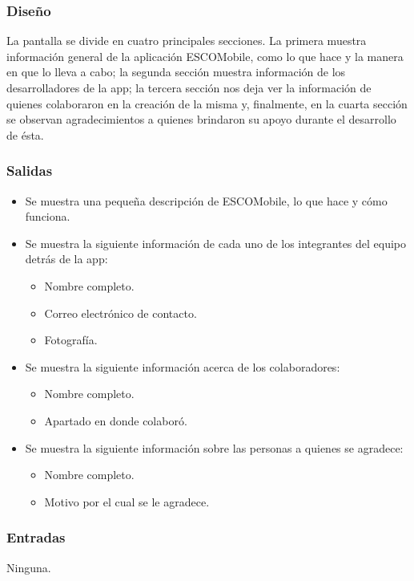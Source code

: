 \subsubsection{Diseño}
	\noindent
	La pantalla se divide en cuatro principales secciones. La primera muestra información general
	de la aplicación ESCOMobile, como lo que hace y la manera en que lo lleva a cabo; la segunda
	sección muestra información de los desarrolladores de la app; la tercera sección nos deja
	ver la información de quienes colaboraron en la creación de la misma y, finalmente, en la cuarta
	sección se observan agradecimientos a quienes brindaron su apoyo durante el desarrollo de ésta.

\pagebreak
{}

\subsubsection{Salidas}
	\begin{itemize}
		\item Se muestra una pequeña descripción de ESCOMobile, lo que hace y cómo funciona. 
		\item Se muestra la siguiente información de cada uno de los integrantes del equipo detrás de la app: 
			\begin{itemize}
				\item Nombre completo. 
				\item Correo electrónico de contacto.
				\item Fotografía.
			\end{itemize}
		\item Se muestra la siguiente información acerca de los colaboradores: 
			\begin{itemize}
				\item Nombre completo. 
				\item Apartado en donde colaboró.
			\end{itemize}
		\item Se muestra la siguiente información sobre las personas a quienes se agradece: 
			\begin{itemize}
				\item Nombre completo. 
				\item Motivo por el cual se le agradece.
			\end{itemize}
	\end{itemize}

\subsubsection{Entradas}
	\noindent
	Ninguna.

